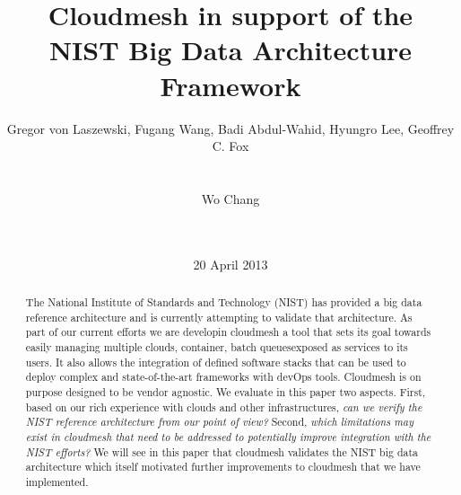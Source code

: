 \newcommand{\AUTHOR}{Gregor von Laszewski, Fugang Wang, Badi
  Abdul-Wahid, Hyungro Lee, Geoffrey C. Fox}
\newcommand{\TITLE}{Cloudmesh in support of the\\NIST Big Data Architecture Framework}





\newcommand{\TODO}[1]{\todo[inline,color=red!20]{#1}}

\TOC

\title{\TITLE}


\author{
\alignauthor
\AUTHOR\\
       \\
       \\
\alignauthor
Wo Chang\\
       \\
       \\
}
\date{20 April 2013}

\maketitle



\begin{abstract}

  The National Institute of Standards and Technology (NIST) has
  provided a big data reference architecture and is currently
  attempting to validate that architecture. As part of our current
  efforts we are developin cloudmesh a tool that sets its goal towards
  easily managing multiple clouds, container, batch queuesexposed as
  services to its users. It also allows the integration of defined
  software stacks that can be used to deploy complex and
  state-of-the-art frameworks with devOps tools. Cloudmesh is on
  purpose designed to be vendor agnostic. We evaluate in this paper
  two aspects. First, based on our rich experience with clouds and
  other infrastructures, {\it can we verify the NIST reference
    architecture from our point of view?} Second, {\it which
    limitations may exist in cloudmesh that need to be
    addressed to potentially improve integration with the NIST
    efforts?}  We will see in this paper that cloudmesh validates the
  NIST big data architecture which itself motivated further
  improvements to cloudmesh that we have implemented.
\end{abstract}



